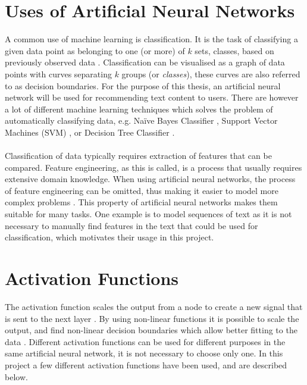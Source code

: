 \section{Uses of Artificial Neural Networks}
A common use of machine learning is classification. It is the task of classifying a given data point as belonging to one (or more) of $k$ sets, classes, based on previously observed data \parencite{Michie94machinelearning}. Classification can be visualised as a graph of data points with curves separating $k$ groups (or \textit{classes}), these curves are also referred to as decision boundaries. For the purpose of this thesis, an artificial neural network will be used for recommending text content to users. There are however a lot of different machine learning techniques which solves the problem of automatically classifying data, e.g. Naïve Bayes Classifier \parencite{rish2001empirical}, Support Vector Machines (SVM) \parencite{boser1992training, cortes1995support}, or Decision Tree Classifier \parencite{safavian1991survey}.
\\\\
Classification of data typically requires extraction of features that can be compared. Feature engineering, as this is called, is a process that usually requires extensive domain knowledge. When using artificial neural networks, the process of feature engineering can be omitted, thus making it easier to model more complex problems \parencite{nlp2011ronan, lecun2015deep}. This property of artificial neural networks makes them suitable for many tasks. One example is to model sequences of text as it is not necessary to manually find features in the text that could be used for classification, which motivates their usage in this project.

\section{Activation Functions}\label{activationfunction}
The activation function scales the output from a node to create a new signal that is sent to the next layer \parencite{basheer2000artificial}. By using non-linear functions it is possible to scale the output, and find non-linear decision boundaries which allow better fitting to the data \parencite{lippmann1987introduction, basheer2000artificial}. Different activation functions can be used for different purposes in the same artificial neural network, it is not necessary to choose only one. In this project a few different activation functions have been used, and are described below.

